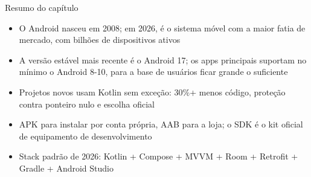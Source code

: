 \begin{tcbsummary}{Resumo do capítulo}
\begin{itemize}
  \item O Android nasceu em 2008; em 2026, é o sistema móvel com a maior fatia de mercado, com bilhões de dispositivos ativos
  \item A versão estável mais recente é o Android 17; os apps principais suportam no mínimo o Android 8-10, para a base de usuários ficar grande o suficiente
  \item Projetos novos usam Kotlin sem exceção: 30\%+ menos código, proteção contra ponteiro nulo e escolha oficial
  \item APK para instalar por conta própria, AAB para a loja; o SDK é o kit oficial de equipamento de desenvolvimento
  \item Stack padrão de 2026: Kotlin + Compose + MVVM + Room + Retrofit + Gradle + Android Studio
\end{itemize}

\end{tcbsummary}
